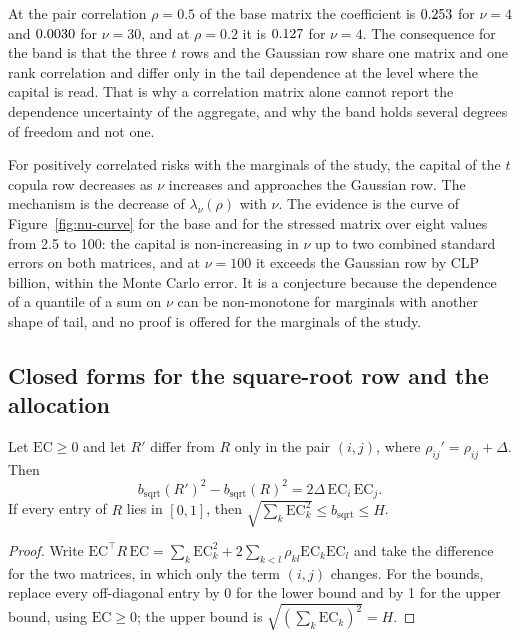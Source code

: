 At the pair correlation $\rho=0.5$ of the base matrix the coefficient is $0.253$ for $\nu=4$ and $0.0030$ for
$\nu=30$, and at $\rho=0.2$ it is $0.127$ for $\nu=4$. The consequence for the band is that the three $t$ rows and
the Gaussian row share one matrix and one rank correlation and differ only in the tail dependence at the level where the capital
is read. That is why a correlation matrix alone cannot report the dependence uncertainty of the aggregate, and why the band holds
several degrees of freedom and not one.

\begin{remark}
\label{conj:nu}
For positively correlated risks with the marginals of the study, the capital of the $t$ copula row decreases as $\nu$ increases
and approaches the Gaussian row. The mechanism is the decrease of $\lambda_\nu(\rho)$ with $\nu$. The evidence is the curve of
Figure~\ref{fig:nu-curve} for the base and for the stressed matrix over eight values from 2.5 to 100: the capital is non-increasing
in $\nu$ up to two combined standard errors on both matrices, and at $\nu=100$ it exceeds the Gaussian row by CLP \bdNuHundredGap{}
billion, within the Monte Carlo error. It is a conjecture because the dependence of a quantile of a sum on $\nu$ can be non-monotone
for marginals with another shape of tail, and no proof is offered for the marginals of the study.
\end{remark}

\subsection{Closed forms for the square-root row and the allocation}
\label{sec:theory-closed}

\begin{proposition}
\label{prop:sqrt}
Let $\mathrm{EC}\ge0$ and let $R'$ differ from $R$ only in the pair $(i,j)$, where $\rho_{ij}'=\rho_{ij}+\Delta$. Then
\begin{equation}
b_{\mathrm{sqrt}}(R')^2-b_{\mathrm{sqrt}}(R)^2=2\Delta\,\mathrm{EC}_i\,\mathrm{EC}_j .
\label{eq:sqrt-shift}
\end{equation}
If every entry of $R$ lies in $[0,1]$, then $\sqrt{\sum_k\mathrm{EC}_k^2}\le b_{\mathrm{sqrt}}\le H$.
\end{proposition}

\begin{proof}
Write $\mathrm{EC}^\top R\,\mathrm{EC}=\sum_k\mathrm{EC}_k^2+2\sum_{k<l}\rho_{kl}\mathrm{EC}_k\mathrm{EC}_l$ and take the difference
for the two matrices, in which only the term $(i,j)$ changes. For the bounds, replace every off-diagonal entry by 0 for the lower
bound and by 1 for the upper bound, using $\mathrm{EC}\ge0$; the upper bound is $\sqrt{(\sum_k\mathrm{EC}_k)^2}=H$.
\end{proof}

